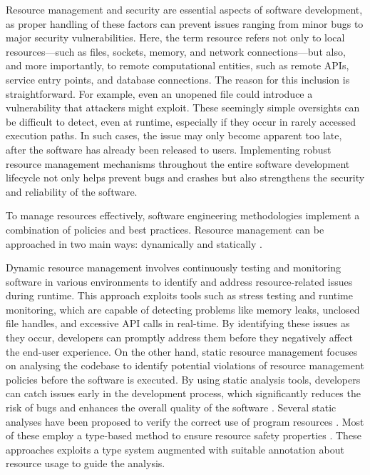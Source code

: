 Resource management and security are essential aspects of software development, as proper handling of these factors can prevent issues ranging from minor bugs to major security vulnerabilities. Here, the term resource refers not only to local resources—such as files, sockets, memory, and network connections—but also, and more importantly, to remote computational entities, such as remote APIs, service entry points, and database connections. The reason for this inclusion is straightforward. For example, even an unopened file could introduce a vulnerability that attackers might exploit. These seemingly simple oversights can be difficult to detect, even at runtime, especially if they occur in rarely accessed execution paths. In such cases, the issue may only become apparent too late, after the software has already been released to users. Implementing robust resource management mechanisms throughout the entire software development lifecycle not only helps prevent bugs and crashes but also strengthens the security and reliability of the software.

To manage resources effectively, software engineering methodologies implement a combination of policies and best practices. Resource management can be approached in two main ways: dynamically \cite{dynamic1-logicguard,dynamic2-java,dynamic3-trace-prop} and statically \cite{static3-types-effects,static1-costa,static2}.

Dynamic resource management involves continuously testing and monitoring software in various environments to identify and address resource-related issues during runtime. This approach exploits tools such as stress testing and runtime monitoring, which are capable of detecting problems like memory leaks, unclosed file handles, and excessive API calls in real-time. By identifying these issues as they occur, developers can promptly address them before they negatively affect the end-user experience. On the other hand, static resource management focuses on analysing the codebase to identify potential violations of resource management policies before the software is executed. By using static analysis tools, developers can catch issues early in the development process, which significantly reduces the risk of bugs and enhances the overall quality of the software \cite{taint}. Several static analyses have been proposed to verify the correct use of program resources \cite{resource-usage,time-regions,enforcing,flow-sensitive,path-sensitive,typestate}. Most of these employ a type-based method to ensure resource safety properties \cite{dynamic4-marriot}. These approaches exploits a type system augmented with suitable annotation about resource usage to guide the analysis.

